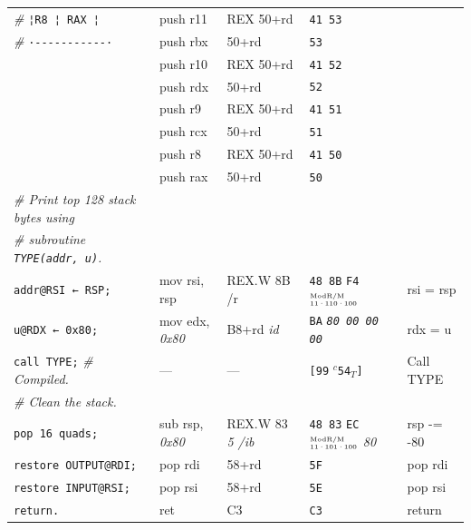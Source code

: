 \documentclass[a4paper,12pt,final]{article}
\begin{document}
\begin{table}[!htbp]
\begin{adjustwidth}{-1cm}{-1cm}
\begin{center}
\begin{tabular}{l|ll|lH}
\emph{\#}\hspace{2.106000em} \texttt{¦}​\hspace{1.053000em}​\texttt{R8  ¦ RAX ¦} & push r11 & REX 50+rd & \texttt{41 53} & \\[0pt]
\emph{\#}\hspace{2.106000em} \texttt{·-{}-{}-{}-{}-{}-{}-{}-{}-{}-{}-·} & push rbx & 50+rd & \texttt{53} & \\[0pt]
 & push r10 & REX 50+rd & \texttt{41 52} & \\[0pt]
 & push rdx & 50+rd & \texttt{52} & \\[0pt]
 & push r9 & REX 50+rd & \texttt{41 51} & \\[0pt]
 & push rcx & 50+rd & \texttt{51} & \\[0pt]
 & push r8 & REX 50+rd & \texttt{41 50} & \\[0pt]
 & push rax & 50+rd & \texttt{50} & \\[0pt]
\emph{\# Print top 128 stack bytes using} &  &  &  & \\[0pt]
\emph{\# subroutine \texttt{TYPE(addr, u)}.} &  &  &  & \\[0pt]
\texttt{addr@RSI ← RSP;} & mov rsi, rsp & REX.W 8B /r & \texttt{48 8B} \texttt{F4}​\(^{\text{\tiny ModR/M}}_{\text{\tiny 11·110·100}}\) & rsi = rsp\\[0pt]
\texttt{u@RDX ← 0x80;} & mov edx, \emph{0x80} & B8+rd \emph{id} & \texttt{BA} \emph{\texttt{80 00 00 00}} & rdx = u\\[0pt]
\texttt{call TYPE;}  \emph{\# Compiled.} & --- & --- & \texttt{[99} \(^{c}\)​\texttt{54}​\(_{T}\)​\texttt{]} & Call TYPE\\[0pt]
\emph{\# Clean the stack.} &  &  &  & \\[0pt]
\texttt{pop 16 quads;} & sub rsp, \emph{0x80} & REX.W 83 \emph{5 /ib} & \texttt{48 83} \texttt{EC}​\(^{\text{\tiny ModR/M}}_{\text{\tiny 11·101·100}}\) \emph{80} & rsp -= -80\\[0pt]
\texttt{restore OUTPUT@RDI;} & pop rdi & 58+rd & \texttt{5F} & pop rdi\\[0pt]
\texttt{restore INPUT@RSI;} & pop rsi & 58+rd & \texttt{5E} & pop rsi\\[0pt]
\texttt{return.} & ret & C3 & \texttt{C3} & return\\[0pt]
\end{tabular}

\end{center}
\normalsize \end{adjustwidth} \end{table} \vspace{0}
\clearpage
\end{document}
